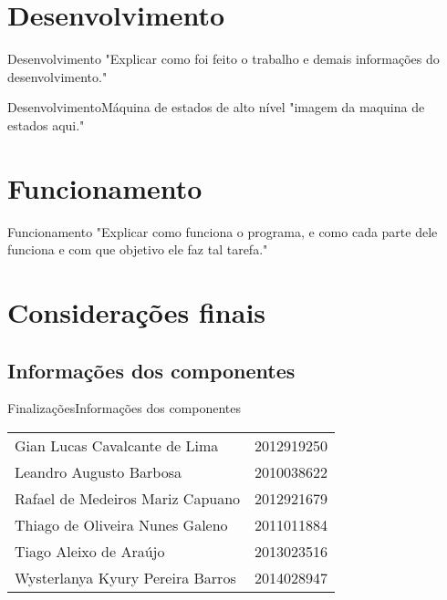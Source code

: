 \documentclass[10pt]{beamer}
\begin{document}
\section{Desenvolvimento}
\begin{frame}{Desenvolvimento}
  "Explicar como foi feito o trabalho e demais informações do desenvolvimento."
\end{frame}

\begin{frame}{Desenvolvimento}{Máquina de estados de alto nível}
  "imagem da maquina de estados aqui."
\end{frame}

\section{Funcionamento}
\begin{frame}{Funcionamento}
  "Explicar como funciona o programa, e como cada parte dele funciona e com que objetivo ele faz tal tarefa."
\end{frame}


\section{Considerações finais}
\subsection{Informações dos componentes}
\begin{frame}{Finalizações}{Informações dos componentes}

\begin{tabular}{lr}
  Gian Lucas Cavalcante de Lima & 2012919250\\
  Leandro Augusto Barbosa & 2010038622 \\
  Rafael de Medeiros Mariz Capuano & 2012921679 \\
  Thiago de Oliveira Nunes Galeno & 2011011884  \\
  Tiago Aleixo de Araújo & 2013023516  \\
  Wysterlanya Kyury Pereira Barros & 2014028947  \\
\end{tabular}

\end{frame}

{\aauwavesbg%
\begin{frame}%
\end{frame}}
\end{document}
